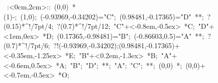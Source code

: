 %


\hbox{
\xy    <2cm,0cm>:<0cm,2cm>::
       (0,0) *\ellipse(1){-}; (1,0); 
       (-0.93969,-0.34202)="C"; (0.98481,-0.17365)="D" **\dir{-}; 
       ?(0.15)*^!/7pt/{4};  ?(0.7)*^!/7pt/{12};  
       "C"+<-0.8em,-0.5ex> *{C}; 
       "D"+<1em,0ex> *{D}; 
       (0.17365,-0.98481)="B"; (-0.86603,0.5)="A" **\dir{-};
       ?(0.7)*^!/7pt/{6};  %
       ?!{(-0.93969,-0.34202);(0.98481,-0.17365)}+<-0.35em,-1.25ex> 
                  *{E};
       "B"+<0.2em,-1.3ex> *{B}; "A"+<-0.6em,0.5ex> *{A}; 
       "B"; "D"; **\dir{-}; "A"; "C"; **\dir{-}; 
       (0,0) *{\bullet}; (0,0)+<-0.7em,-0.5ex> *{O};
\endxy}



